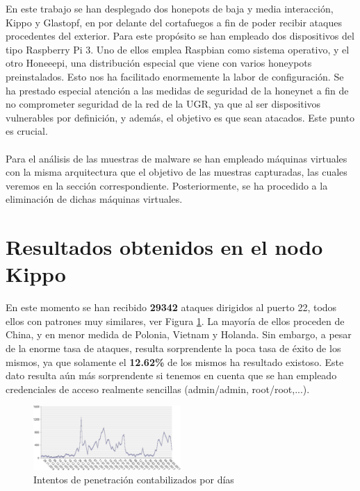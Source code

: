 \documentclass[journal]{IEEEtran}
\begin{document}
En este trabajo se han desplegado dos honepots de baja y media interacción, Kippo y Glastopf, en por delante del cortafuegos a fin de poder recibir ataques procedentes del exterior. Para este propósito se han empleado dos dispositivos del tipo Raspberry Pi 3. Uno de ellos emplea Raspbian como sistema operativo, y el otro Honeeepi, una distribución especial que viene con varios honeypots preinstalados. Esto nos ha facilitado enormemente la labor de configuración. Se ha prestado especial atención a las medidas de seguridad de la honeynet a fin de no comprometer seguridad de la red de la UGR, ya que al ser dispositivos vulnerables por definición, y además, el objetivo es que sean atacados. Este punto es crucial.
\\\\
Para el análisis de las muestras de malware se han empleado máquinas virtuales con la misma arquitectura que el objetivo de las muestras capturadas, las cuales veremos en la sección correspondiente. Posteriormente, se ha procedido a la eliminación de dichas máquinas virtuales.


\section{Resultados obtenidos en el nodo Kippo}

En este momento se han recibido \textbf{29342} ataques dirigidos al puerto 22, todos ellos con patrones muy similares, ver Figura \ref{fig:pruebas_dia}. La mayoría de ellos proceden de China, y en menor medida de Polonia, Vietnam y Holanda. Sin embargo, a pesar de la enorme tasa de ataques, resulta sorprendente la poca tasa de éxito de los mismos, ya que solamente el \textbf{12.62\%} de los mismos ha resultado existoso. Este dato resulta aún más sorprendente si tenemos en cuenta que se han empleado credenciales de acceso realmente sencillas (admin/admin, root/root,...).

\begin{figure}[H]
\centering
\includegraphics[width=0.5\textwidth]{img/pruebas_dia}
\caption{Intentos de penetración contabilizados por días}
\label{fig:pruebas_dia}
\end{figure}
\end{document}
